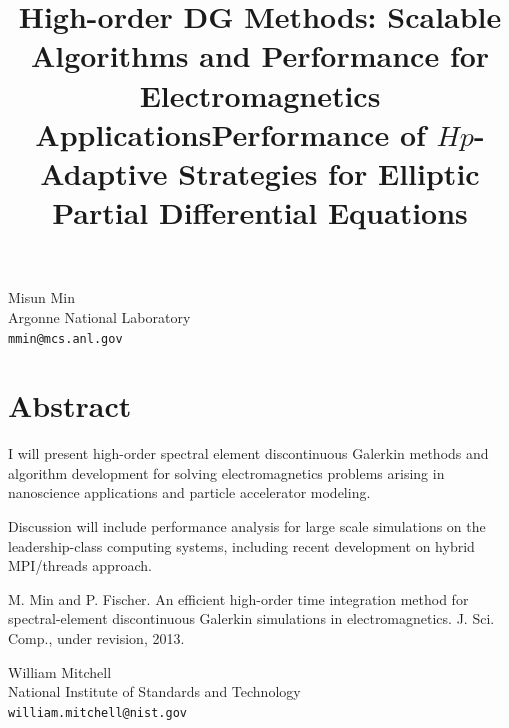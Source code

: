 \documentclass[article, A4, 11pt]{llncs}%
\begin{document}
\title{High-order DG Methods: Scalable Algorithms and Performance for Electromagnetics Applications}
 \author{} \institute{}
\maketitle
\begin{center}
{\large Misun Min}\\
Argonne National Laboratory\\
{\tt mmin@mcs.anl.gov}
\end{center}

\section*{Abstract}
I will present high-order spectral element discontinuous Galerkin methods and algorithm development for solving electromagnetics problems arising in nanoscience applications and particle accelerator modeling. 

Discussion will include performance analysis for large scale simulations on the leadership-class computing systems, including recent development on hybrid MPI/threads approach. 




\begin{thebibliography}{10}
{\sc M. Min and P. Fischer}. {An efficient high-order time integration method for spectral-element discontinuous Galerkin simulations in electromagnetics}. J. Sci. Comp., under revision, 2013.
\end{thebibliography} %

\title{Performance of $Hp$-Adaptive Strategies for Elliptic Partial Differential Equations}
 \author{} \institute{}
\maketitle
\begin{center}
{\large William Mitchell}\\
National Institute of Standards and Technology\\
{\tt william.mitchell@nist.gov}
\end{center}
\end{document}
